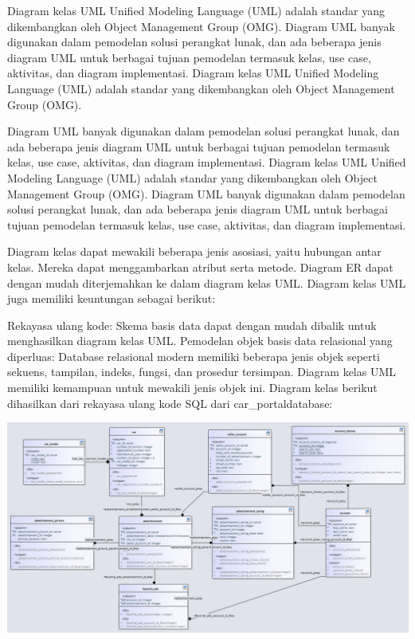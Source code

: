 \documentclass[]{book}
\begin{document}
Diagram kelas UML Unified Modeling Language (UML) adalah standar yang dikembangkan oleh Object Management Group (OMG). Diagram UML banyak digunakan dalam pemodelan solusi perangkat lunak, dan ada beberapa jenis diagram UML untuk berbagai tujuan pemodelan termasuk kelas, use case, aktivitas, dan diagram implementasi. Diagram kelas UML Unified Modeling Language (UML) adalah standar yang dikembangkan oleh Object Management Group (OMG).

Diagram UML banyak digunakan dalam pemodelan solusi perangkat lunak, dan ada beberapa jenis diagram UML untuk berbagai tujuan pemodelan termasuk kelas, use case, aktivitas, dan diagram implementasi. Diagram kelas UML Unified Modeling Language (UML) adalah standar yang dikembangkan oleh Object Management Group (OMG). Diagram UML banyak digunakan dalam pemodelan solusi perangkat lunak, dan ada beberapa jenis diagram UML untuk berbagai tujuan pemodelan termasuk kelas, use case, aktivitas, dan diagram implementasi.

Diagram kelas dapat mewakili beberapa jenis asosiasi, yaitu hubungan antar kelas. Mereka dapat menggambarkan atribut serta metode. Diagram ER dapat dengan mudah diterjemahkan ke dalam diagram kelas UML. Diagram kelas UML juga memiliki keuntungan sebagai berikut:

Rekayasa ulang kode: Skema basis data dapat dengan mudah dibalik untuk menghasilkan diagram kelas UML. Pemodelan objek basis data relasional yang diperluas: Database relasional modern memiliki beberapa jenis objek seperti sekuens, tampilan, indeks, fungsi, dan prosedur tersimpan. Diagram kelas UML memiliki kemampuan untuk mewakili jenis objek ini. Diagram kelas berikut dihasilkan dari rekayasa ulang kode SQL dari car\_portaldatabase:

\begin{center}\includegraphics[width=0.9\linewidth]{img/01/db_model4} \end{center}
\end{document}
